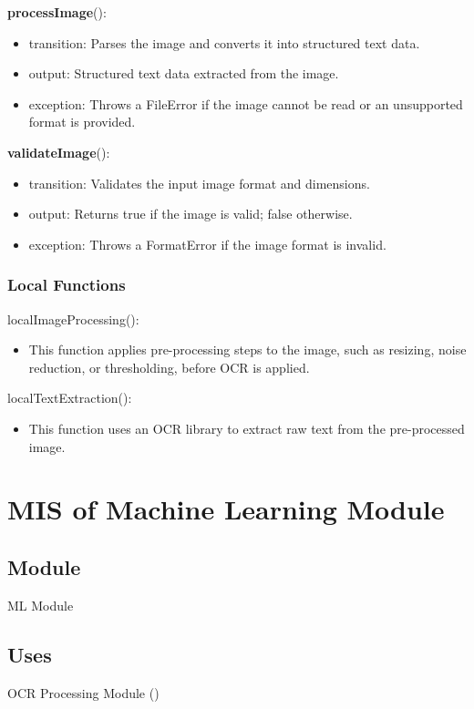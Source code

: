 \documentclass[12pt, titlepage]{article}
\begin{document}
\noindent \textbf{processImage}():
\begin{itemize}
\item transition: Parses the image and converts it into structured text data.
\item output: Structured text data extracted from the image.
\item exception: Throws a FileError if the image cannot be read or an unsupported format is provided.
\end{itemize}

\noindent \textbf{validateImage}():
\begin{itemize}
\item transition: Validates the input image format and dimensions.
\item output: Returns true if the image is valid; false otherwise.
\item exception: Throws a FormatError if the image format is invalid.
\end{itemize}

\subsubsection{Local Functions}

localImageProcessing():
\begin{itemize}
\item This function applies pre-processing steps to the image, such as resizing, noise reduction, or thresholding, before OCR is applied.
\end{itemize}

localTextExtraction():
\begin{itemize}
\item This function uses an OCR library to extract raw text from the pre-processed image.
\end{itemize}

\newpage



\section{MIS of Machine Learning Module}\label{ML_Module}

\subsection{Module}
ML Module

\subsection{Uses}
OCR Processing Module ()
\end{document}
